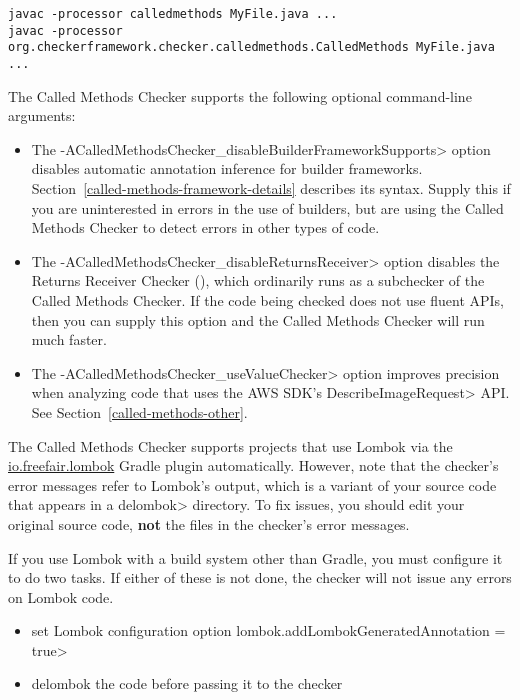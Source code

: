 
\begin{Verbatim}
javac -processor calledmethods MyFile.java ...
javac -processor org.checkerframework.checker.calledmethods.CalledMethods MyFile.java ...
\end{Verbatim}

The Called Methods Checker supports the following optional command-line arguments:
\begin{itemize}
\item The \<-ACalledMethodsChecker\_disableBuilderFrameworkSupports> option disables automatic
 annotation inference for builder frameworks.
 Section~\ref{called-methods-framework-details} describes its syntax.
 Supply this if you are uninterested in errors in the use of builders, but
 are using the Called Methods Checker to detect errors in other types of
 code.
\item The \<-ACalledMethodsChecker\_disableReturnsReceiver> option disables
  the Returns Receiver Checker (),
  which ordinarily runs as a subchecker of the Called Methods Checker.  If
  the code being checked does not use fluent APIs, then you can supply this
  option and the Called Methods Checker will run much faster.
\item The \<-ACalledMethodsChecker\_useValueChecker> option improves precision when analyzing
 code that uses the AWS SDK's \<DescribeImageRequest> API\@.  See
 Section~\ref{called-methods-other}.
\end{itemize}


The Called Methods Checker supports projects that use Lombok via
the \href{https://plugins.gradle.org/plugin/io.freefair.lombok}{io.freefair.lombok} Gradle plugin automatically.
However, note that the checker's error messages refer to Lombok's output, which is a variant of your source code
that appears in a \<delombok> directory.
To fix issues, you should edit your original source code, \textbf{not} the files in the checker's error messages.

If you use Lombok with a build system other than Gradle, you must configure it to do two tasks.
If either of these is not done, the checker will not issue any errors on Lombok code.
\begin{itemize}
\item set Lombok configuration option \<lombok.addLombokGeneratedAnnotation = true>
\item delombok the code before passing it to the checker
\end{itemize}



